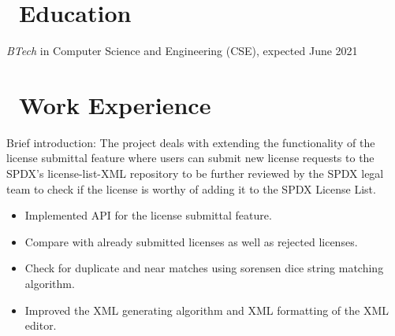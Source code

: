 \documentclass{resume}
\begin{document}



\section{\faGraduationCap\ Education}
\textit{BTech} in Computer Science and Engineering (CSE), expected June 2021

\section{\faUsers\ Work Experience}
Brief introduction: The project deals with extending the functionality of the license submittal feature where users can submit new license requests to the SPDX’s license-list-XML repository to be further reviewed by the SPDX legal team to check if the license is worthy of adding it to the SPDX License List.
\begin{itemize}
  \item Implemented API for the license submittal feature.
  \item Compare with already submitted licenses as well as rejected licenses.
  \item Check for duplicate and near matches using sorensen dice string matching algorithm.
  \item Improved the XML generating algorithm and XML formatting of the XML editor.
\end{itemize}
\end{document}
